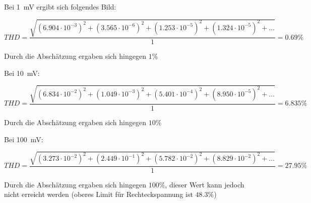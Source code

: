 Bei \SI{1}{\milli \volt} ergibt sich folgendes Bild:

\begin{equation*}
    THD = \frac{\sqrt{(6.904\cdot10^{-3})^2 + (3.565\cdot10^{-6})^2 + (1.253\cdot10^{-5})^2 +(1.324\cdot10^{-5})^2 + \ldots}}{1} = 0.69 \%
\end{equation*}

Durch die Abschätzung ergaben sich hingegen $1\%$

Bei \SI{10}{\milli \volt}:

\begin{equation*}
    THD = \frac{\sqrt{(6.834\cdot10^{-2})^2 + (1.049\cdot10^{-3})^2 + (5.401\cdot10^{-4})^2 +(8.950\cdot10^{-5})^2 + \ldots}}{1} = 6.835 \%
\end{equation*}

Durch die Abschätzung ergaben sich hingegen $10\%$

Bei \SI{100}{\milli \volt}:

\begin{equation*}
    THD = \frac{\sqrt{(3.273\cdot10^{-2})^2 + (2.449\cdot10^{-1})^2 + (5.782\cdot10^{-2})^2 +(8.829\cdot10^{-2})^2 + \ldots}}{1} = 27.95 \%
\end{equation*}

Durch die Abschätzung ergaben sich hingegen $100\%$, dieser Wert kann jedoch nicht erreicht werden (oberes Limit für Rechteckspannung ist $48.3 \%$)